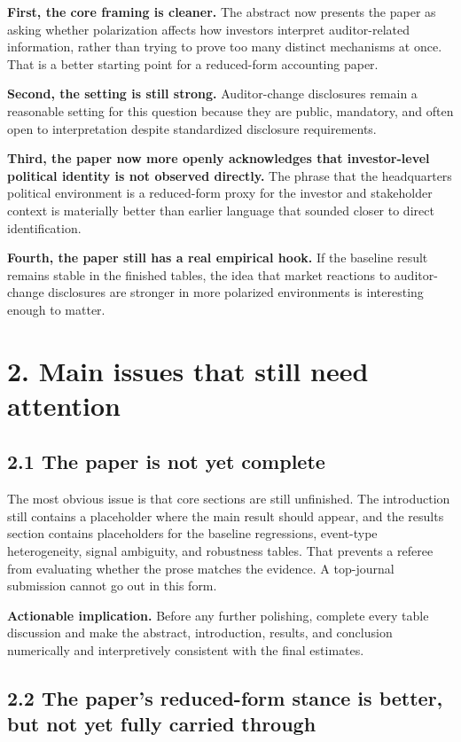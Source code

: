 \documentclass[11pt]{article}
\begin{document}
\textbf{First, the core framing is cleaner.} The abstract now presents the paper as asking whether polarization affects how investors interpret auditor-related information, rather than trying to prove too many distinct mechanisms at once. That is a better starting point for a reduced-form accounting paper.

\textbf{Second, the setting is still strong.} Auditor-change disclosures remain a reasonable setting for this question because they are public, mandatory, and often open to interpretation despite standardized disclosure requirements.

\textbf{Third, the paper now more openly acknowledges that investor-level political identity is not observed directly.} The phrase that the headquarters political environment is a reduced-form proxy for the investor and stakeholder context is materially better than earlier language that sounded closer to direct identification.

\textbf{Fourth, the paper still has a real empirical hook.} If the baseline result remains stable in the finished tables, the idea that market reactions to auditor-change disclosures are stronger in more polarized environments is interesting enough to matter.

\section*{2. Main issues that still need attention}

\subsection*{2.1 The paper is not yet complete}

The most obvious issue is that core sections are still unfinished. The introduction still contains a placeholder where the main result should appear, and the results section contains placeholders for the baseline regressions, event-type heterogeneity, signal ambiguity, and robustness tables. That prevents a referee from evaluating whether the prose matches the evidence. A top-journal submission cannot go out in this form.

\textbf{Actionable implication.} Before any further polishing, complete every table discussion and make the abstract, introduction, results, and conclusion numerically and interpretively consistent with the final estimates.

\subsection*{2.2 The paper's reduced-form stance is better, but not yet fully carried through}
\end{document}
